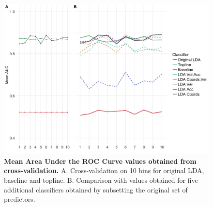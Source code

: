 \documentclass{article}
\begin{document}
\begin{figure}[h]
\centering
\includegraphics[width=\textwidth]{auc_calibration_1.png}
\caption{\textbf{Mean Area Under the ROC Curve values obtained from cross-validation.} A. Cross-validation on 10 bins for original LDA, baseline and topline. B. Comparison with values obtained for five additional classifiers obtained by subsetting the original set of predictors.} \label{DIST:AUC}
\end{figure}
\end{document}
